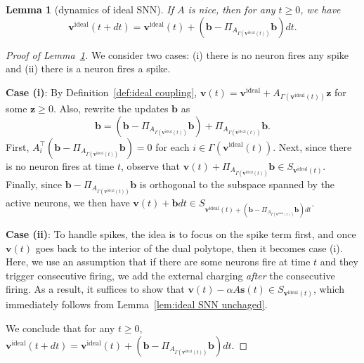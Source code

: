 \documentclass[11pt]{article}
\newtheorem{lemma}{Lemma}[section]
\theoremstyle{remark}
\theoremstyle{definition}
\newcommand{\bb}{\mathbf{b}}
\newcommand{\bz}{\mathbf{z}}
\newcommand{\bv}{\mathbf{v}}
\newcommand{\bs}{\mathbf{s}}
\begin{document}
\begin{lemma}[dynamics of ideal SNN]\label{lem:ideal SNN dynamics}
	If $A$ is nice, then for any $t\geq0$, we have
	$$\bv^\text{ideal}(t+dt)=\bv^\text{ideal}(t) + \left(\bb-\Pi_{A_{\Gamma(\bv^\text{ideal}(t))}}\bb\right)dt.$$
\end{lemma}
\begin{proof}[Proof of Lemma~\ref{lem:ideal SNN dynamics}]
	We consider two cases: (i) there is no neuron fires any spike and (ii) there is a neuron fires a spike.
	
	\textbf{Case (i)}: By Definition~\ref{def:ideal coupling}, $\bv(t)=\bv^\text{ideal}+A_{\Gamma(\bv^\text{ideal}(t))}\bz$ for some $\bz\geq0$. Also, rewrite the updates $\bb$ as 
	$$\bb=\left(\bb-\Pi_{A_{\Gamma(\bv^\text{ideal}(t))}}\bb\right)+\Pi_{A_{\Gamma(\bv^\text{ideal}(t))}}\bb.$$
	First, $A_i^\top\left(\bb-\Pi_{A_{\Gamma(\bv^\text{ideal}(t))}}\bb\right)=0$ for each $i\in\Gamma(\bv^\text{ideal}(t))$. Next, since there is no neuron fires at time $t$, observe that $\bv(t)+\Pi_{A_{\Gamma(\bv^\text{ideal}(t))}}\bb\in S_{\bv^\text{ideal}(t)}$. Finally, since $\bb-\Pi_{A_{\Gamma(\bv^\text{ideal}(t))}}\bb$ is orthogonal to the subspace spanned by the active neurons, we then have $\bv(t)+\bb dt\in S_{\bv^\text{ideal}(t)+(\bb-\Pi_{A_{\Gamma(\bv^\text{ideal}(t))}}\bb)dt}$.
	
	\textbf{Case (ii)}: To handle spikes, the idea is to focus on the spike term first, and once $\bv(t)$ goes back to the interior of the dual polytope, then it becomes case (i). Here, we use an assumption that if there are some neurons fire at time $t$ and they trigger consecutive firing, we add the external charging \textit{after} the consecutive firing. As a result, it suffices to show that $\bv(t)-\alpha A\bs(t)\in S_{\bv^\text{ideal}(t)}$, which immediately follows from Lemma~\ref{lem:ideal SNN unchaged}.
	
	We conclude that for any $t\geq0$, $\bv^\text{ideal}(t+dt)=\bv^\text{ideal}(t) + \left(\bb-\Pi_{A_{\Gamma(\bv^\text{ideal}(t))}}\bb\right)dt$.
\end{proof}
\end{document}
